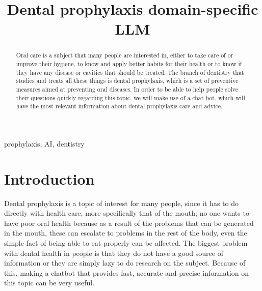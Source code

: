 \documentclass[conference]{IEEEtran}
\begin{document}
\title{Dental prophylaxis domain-specific LLM\\

}

\author{
\and
{}
}

\maketitle

\begin{abstract}
    Oral care is a subject that many people are interested in, either to take care of or improve their hygiene, to know and apply better habits for their health or to know if they have any disease or cavities that should be treated. The branch of dentistry that studies and treats all these things is dental prophylaxis, which is a set of preventive measures aimed at preventing oral diseases. In order to be able to help people solve their questions quickly regarding this topic, we will make use of a chat bot, which will have the most relevant information about dental prophylaxis care and advice. 
\end{abstract}

\begin{IEEEkeywords}
prophylaxis, AI, dentistry
\end{IEEEkeywords}

\section{Introduction}
Dental prophylaxis is a topic of interest for many people, since it has to do directly with health care, more specifically that of the mouth; no one wants to have poor oral health because as a result of the problems that can be generated in the mouth, these can escalate to problems in the rest of the body, even the simple fact of being able to eat properly can be affected. The biggest problem with dental health in people is that they do not have a good source of information or they are simply lazy to do research on the subject. Because of this, making a chatbot that provides fast, accurate and precise information on this topic can be very useful.
\end{document}
